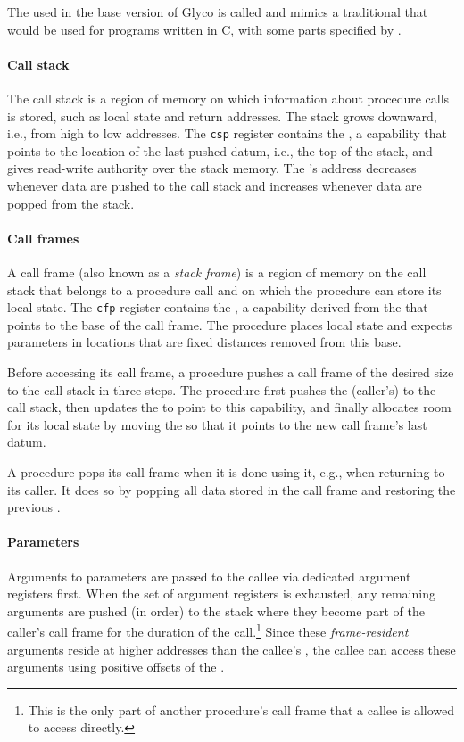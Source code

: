 \documentclass[main.tex]{subfiles}
\begin{document}
The  used in the base version of Glyco is called \textbf{} and mimics a traditional  that would be used for programs written in C, with some parts specified by \cite[chapter~25]{riscv}.

\paragraph{Call stack} The call stack is a region of memory on which information about procedure calls is stored, such as local state and return addresses. The stack grows downward, i.e., from high to low addresses. The \texttt{csp} register contains the \textbf{}, a capability that points to the location of the last pushed datum, i.e., the top of the stack, and gives read-write authority over the stack memory. The 's address decreases whenever data are pushed to the call stack and increases whenever data are popped from the stack.

\paragraph{Call frames} A call frame (also known as a \emph{stack frame}) is a region of memory on the call stack that belongs to a procedure call and on which the procedure can store its local state. The \texttt{cfp} register contains the \textbf{}, a capability derived from the  that points to the base of the call frame. The procedure places local state and expects parameters in locations that are fixed distances removed from this base.

Before accessing its call frame, a procedure pushes a call frame of the desired size to the call stack in three steps. The procedure first pushes the (caller's)  to the call stack, then updates the  to point to this capability, and finally allocates room for its local state by moving the  so that it points to the new call frame's last datum.

A procedure pops its call frame when it is done using it, e.g., when returning to its caller. It does so by popping all data stored in the call frame and restoring the previous .

\paragraph{Parameters} Arguments to parameters are passed to the callee via dedicated argument registers first. When the set of argument registers is exhausted, any remaining arguments are pushed (in order) to the stack where they become part of the caller's call frame for the duration of the call.\footnote{This is the only part of another procedure's call frame that a callee is allowed to access directly.} Since these \emph{frame-resident} arguments reside at higher addresses than the callee's , the callee can access these arguments using positive offsets of the .
\end{document}
